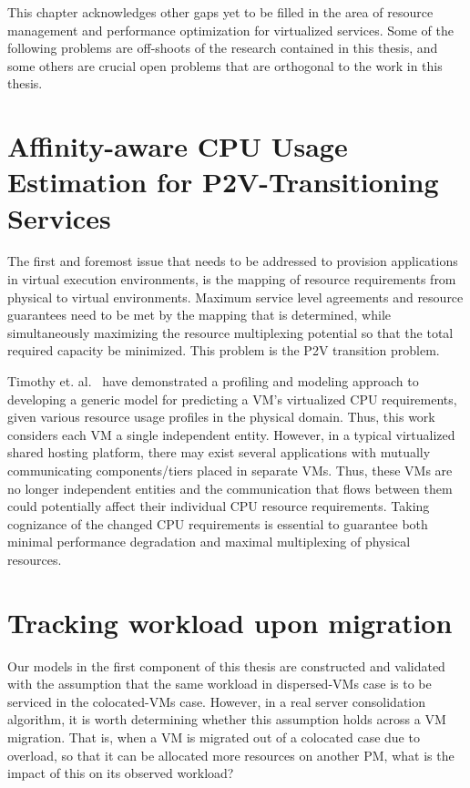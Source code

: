 

This chapter acknowledges other gaps yet to be filled in the area of
resource management and performance optimization for virtualized
services. 
Some of the following problems are off-shoots of the research
contained in this thesis, and some others are crucial open problems
that are orthogonal to the work in this thesis. 

\section{Affinity-aware CPU Usage Estimation for P2V-Transitioning Services}
The first and foremost issue that needs to be addressed to provision
applications in virtual execution environments, is the mapping of resource
requirements from physical to virtual environments.
Maximum service level agreements and resource guarantees need to be met
by the mapping that is determined, while simultaneously
maximizing the resource multiplexing potential so that the total required
capacity be minimized. This problem is the P2V transition problem.

Timothy et. al.~\cite{profiling-and-modeling} have demonstrated a profiling
and modeling approach to developing a generic model for predicting a VM's
virtualized CPU requirements, given various resource usage profiles in the
physical domain. Thus, this work considers each VM a single independent
entity. However, in a typical virtualized shared hosting platform, there
may exist several applications with mutually communicating components/tiers
placed in separate VMs. Thus, these VMs are no longer independent entities
and the communication that flows between them could potentially affect
their individual CPU resource requirements. Taking cognizance of the
changed CPU requirements is essential to guarantee both minimal performance
degradation and maximal multiplexing of physical resources.

\section{Tracking workload upon migration}
Our models in the first component of this thesis are constructed and 
validated with the assumption that
the same workload in dispersed-VMs case is to be serviced
in the colocated-VMs case. However, in a real server consolidation
algorithm, it is worth determining whether this assumption holds across
a VM migration. That is, when a VM is migrated out of a colocated
case due to overload, so that it can be allocated more resources 
on another PM, what is the impact of this on its observed workload?

